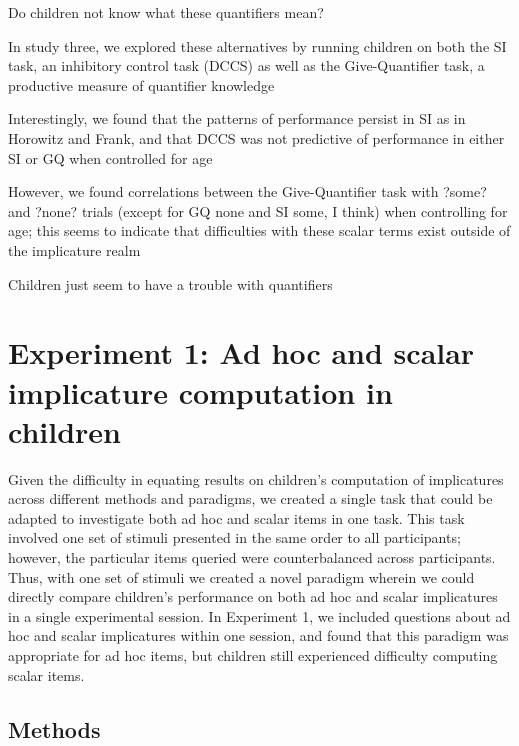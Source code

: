 \documentclass[man]{apa2}
\begin{document}
Do children not know what these quantifiers mean?

In study three, we explored these alternatives by running children on both the SI task, an inhibitory control task (DCCS) as well as the Give-Quantifier task, a productive measure of quantifier knowledge

Interestingly, we found that the patterns of performance persist in SI as in Horowitz and Frank, and that DCCS was not predictive of performance in either SI or GQ when controlled for age

However, we found correlations between the Give-Quantifier task with ?some? and ?none? trials (except for GQ none and SI some, I think) when controlling for age; this seems to indicate that difficulties with these scalar terms exist outside of the implicature realm

Children just seem to have a trouble with quantifiers


\section{Experiment 1: Ad hoc and scalar implicature computation in children}

Given the difficulty in equating results on children's computation of implicatures across different methods and paradigms, we created a single task that could be adapted to investigate both ad hoc and scalar items in one task. This task involved one set of stimuli presented in the same order to all participants; however, the particular items queried were counterbalanced across participants. Thus, with one set of stimuli we created a novel paradigm wherein we could directly compare children's performance on both ad hoc and scalar implicatures in a single experimental session. In Experiment 1, we included questions about ad hoc and scalar implicatures within one session, and found that this paradigm was appropriate for ad hoc items, but children still experienced difficulty computing scalar items.


\subsection{Methods}
\end{document}
